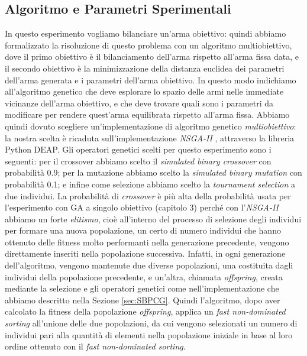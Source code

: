 \documentclass[12pt, italian]{toptesi}
\begin{document}
\subsection{Algoritmo e Parametri Sperimentali}
\label{sec:nsga2}
In questo esperimento vogliamo bilanciare un'arma obiettivo: quindi abbiamo formalizzato la risoluzione di questo problema con un algoritmo multiobiettivo, dove il primo obiettivo è il bilanciamento dell'arma rispetto all'arma fissa data, e il secondo obiettivo è la minimizzazione della distanza euclidea dei parametri dell'arma generata e i parametri dell'arma obiettivo.
In questo modo indichiamo all'algoritmo genetico che deve esplorare lo spazio delle armi nelle immediate vicinanze dell'arma obiettivo, e che deve trovare quali sono i parametri da modificare per rendere quest'arma equilibrata rispetto all'arma fissa.
Abbiamo quindi dovuto scegliere un'implementazione di algoritmo genetico \emph{multiobiettivo}: la nostra scelta è ricaduta sull'implementazione \emph{NSGA-II} \cite{nsga2:article}, attraverso la libreria {P}ython  DEAP\cite{deap:article}.
Gli operatori genetici scelti per questo esperimento sono i seguenti:  per il crossover abbiamo scelto il \emph{simulated binary crossover} con probabilità 0.9; per la mutazione abbiamo scelto la \emph{simulated binary mutation} con probabilità 0.1; e infine come selezione abbiamo scelto la \emph{tournament selection} a due individui.
La probabilità di \emph{crossover} è più alta della probabilità usata per l'esperimento con GA a singolo obiettivo (capitolo 3) perché con l'\emph{NSGA-II} abbiamo un forte \emph{elitismo}, cioè all'interno del processo di selezione degli individui per formare una nuova popolazione, un certo di numero individui che hanno ottenuto delle fitness molto performanti nella generazione precedente, vengono direttamente inseriti nella popolazione successiva. Infatti, in ogni generazione dell'algoritmo, vengono mantenute due diverse popolazioni, una costituita dagli individui della popolazione precedente, e un'altra, chiamata \emph{offspring}, creata mediante la selezione e gli operatori genetici come nell'implementazione che abbiamo descritto nella Sezione \ref{sec:SBPCG}. Quindi l'algoritmo, dopo aver calcolato la fitness della popolazione \emph{offspring}, applica un \emph{fast non-dominated sorting}\cite{nsga2:article} all'unione delle due popolazioni, da cui vengono selezionati un numero di individui pari alla quantità di elementi nella popolazione iniziale in base al loro ordine ottenuto con il \emph{fast non-dominated sorting}.
\end{document}
